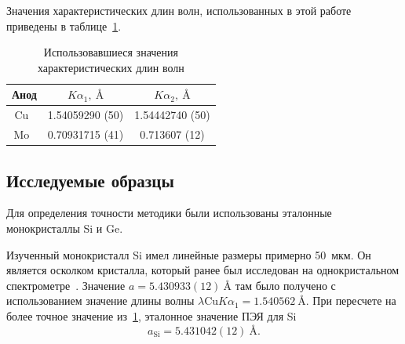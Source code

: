 \documentclass[a4paper,14pt]{extarticle}
\newcommand{\unit}[1]{ \ \text{#1}}
\newcommand{\degree}{^\circ}
\begin{document}

Значения характеристических длин волн, использованных в этой работе приведены в таблице~\ref{tab:wavelengths}.
\begin{table}[ht!]\label{tab:wavelengths}
    \centering
    \begin{tabular}{|c|c|c|}  
        \hline
        Анод & $K\alpha_1,\unit{\AA}$ & $K\alpha_2,\unit{\AA}$ \\
        \hline
        Cu~\cite{Holzer:1997} & 1.54059290 (50) & 1.54442740 (50) \\
        Mo~\cite{Deslattes:1985} & 0.70931715 (41) & 0.713607 (12) \\
        \hline
    \end{tabular}
    \caption{Использовавшиеся значения характеристических длин волн}
\end{table}
\subsection{Исследуемые образцы}
Для определения точности методики были использованы эталонные монокристаллы Si и Ge.

Изученный монокристалл Si имел линейные размеры примерно 50~мкм.
Он является осколком кристалла, который ранее был исследован на однокристальном спектрометре~\cite{Lisoivan:1982}.
Значение $a = 5.430933(12)\unit{\AA}$ там было получено с использованием значение длины волны $\lambda \text{Cu} K \alpha_1 = 1.540562\unit{\AA}$.
При пересчете на более точное значение из~\ref{tab:wavelengths}, эталонное значение ПЭЯ для Si
\[ a_\text{Si} = 5.431042 (12)\unit{\AA}. \]
\end{document}

